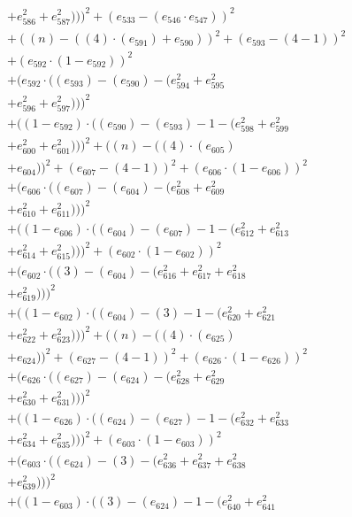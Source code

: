 \documentclass[10pt, a4paper]{article}
\begin{document}
\begin{align*}
& + e_{586}^{2} + e_{587}^{2})))^{2} + (e_{533} - (e_{546}  \cdot  e_{547}))^{2} \\
& + ((n) - ((4)  \cdot  (e_{591}) + e_{590}))^{2} + (e_{593} - (4 - 1))^{2} \\
& + (e_{592}  \cdot  (1 - e_{592}))^{2} \\
& + (e_{592}  \cdot  ((e_{593}) - (e_{590}) - (e_{594}^{2} + e_{595}^{2} \\
& + e_{596}^{2} + e_{597}^{2})))^{2} \\
& + ((1 - e_{592})  \cdot  ((e_{590}) - (e_{593}) - 1 - (e_{598}^{2} + e_{599}^{2} \\
& + e_{600}^{2} + e_{601}^{2})))^{2} + ((n) - ((4)  \cdot  (e_{605}) \\
& + e_{604}))^{2} + (e_{607} - (4 - 1))^{2} + (e_{606}  \cdot  (1 - e_{606}))^{2} \\
& + (e_{606}  \cdot  ((e_{607}) - (e_{604}) - (e_{608}^{2} + e_{609}^{2} \\
& + e_{610}^{2} + e_{611}^{2})))^{2} \\
& + ((1 - e_{606})  \cdot  ((e_{604}) - (e_{607}) - 1 - (e_{612}^{2} + e_{613}^{2} \\
& + e_{614}^{2} + e_{615}^{2})))^{2} + (e_{602}  \cdot  (1 - e_{602}))^{2} \\
& + (e_{602}  \cdot  ((3) - (e_{604}) - (e_{616}^{2} + e_{617}^{2} + e_{618}^{2} \\
& + e_{619}^{2})))^{2} \\
& + ((1 - e_{602})  \cdot  ((e_{604}) - (3) - 1 - (e_{620}^{2} + e_{621}^{2} \\
& + e_{622}^{2} + e_{623}^{2})))^{2} + ((n) - ((4)  \cdot  (e_{625}) \\
& + e_{624}))^{2} + (e_{627} - (4 - 1))^{2} + (e_{626}  \cdot  (1 - e_{626}))^{2} \\
& + (e_{626}  \cdot  ((e_{627}) - (e_{624}) - (e_{628}^{2} + e_{629}^{2} \\
& + e_{630}^{2} + e_{631}^{2})))^{2} \\
& + ((1 - e_{626})  \cdot  ((e_{624}) - (e_{627}) - 1 - (e_{632}^{2} + e_{633}^{2} \\
& + e_{634}^{2} + e_{635}^{2})))^{2} + (e_{603}  \cdot  (1 - e_{603}))^{2} \\
& + (e_{603}  \cdot  ((e_{624}) - (3) - (e_{636}^{2} + e_{637}^{2} + e_{638}^{2} \\
& + e_{639}^{2})))^{2} \\
& + ((1 - e_{603})  \cdot  ((3) - (e_{624}) - 1 - (e_{640}^{2} + e_{641}^{2} \\

\end{align*}
\end{document}
